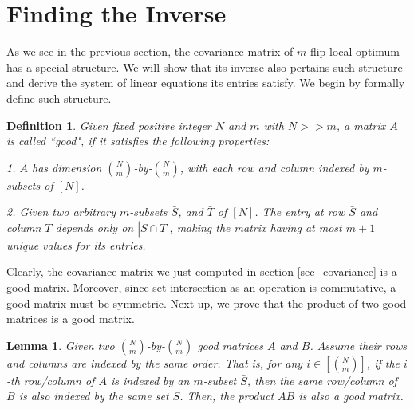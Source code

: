 \documentclass[10pt]{article}
\newtheorem{lemma}{\bf Lemma}
\newtheorem{definition}{\bf Definition}
\newenvironment{Proof of lemma}{\noindent{\bf Proof of Lemma}}{\hfill$\Box$\newline}
\newenvironment{Proof of claim}{\noindent{\bf Proof of claim}}{\hfill$\Box$\newline}
\newenvironment{Proof of theorem}{\noindent{\bf Proof of Theorem}}{\hfill\scriptsize{$\Box$}\newline}
\newenvironment{Proof of theorems}{\noindent{\bf Proof of Theorems}}{\hfill$\Box$\newline}
\newenvironment{Proof of proposition}{\noindent{\bf Proof of Proposition}}{\hfill$\Box$\newline}
\newenvironment{Proof of propositions}{\noindent{\bf Proof of Propositions}}{\hfill$\Box$\newline}
\newenvironment{Proof of exercise}{\noindent{\it Proof of Exercise:}}{\hfill$\Box$}
\numberwithin{equation}{section}
\begin{document}
\section{Finding the Inverse} \label{sec_inverse}
As we see in the previous section, the covariance matrix of $m$-flip local optimum has a special structure. We will show that its inverse also pertains such structure and derive the system of linear equations its entries satisfy. We begin by formally define such structure.
\begin{definition}
    Given fixed positive integer $N$ and $m$ with $N >> m$, a matrix $A$ is called ``good", if it satisfies the following properties:

    1. $A$ has dimension $\binom{N}{m}$-by-$\binom{N}{m}$, with each row and column indexed by $m$-subsets of $[N]$.

    2. Given two arbitrary $m$-subsets $\bar{S}$, and $\bar{T}$ of $[N]$. The entry at row $\bar{S}$ and column $\bar{T}$ depends only on $|\bar{S} \cap \bar{T}|$, making the matrix having at most $m+1$ unique values for its entries.
\end{definition}
Clearly, the covariance matrix we just computed in section \ref{sec_covariance} is a good matrix. Moreover, since set intersection as an operation is commutative, a good matrix must be symmetric. Next up, we prove that the product of two good matrices is a good matrix. 
\begin{lemma} \label{good_matrix_lemma}
    Given two $\binom{N}{m}$-by-$\binom{N}{m}$ good matrices $A$ and $B$. Assume their rows and columns are indexed by the same order. That is, for any $i \in [\binom{N}{m}]$, if the $i$-th row/column of $A$ is indexed by an $m$-subset $\bar{S}$, then the same row/column of $B$ is also indexed by the same set $\bar{S}$. Then, the product $AB$ is also a good matrix. 
\end{lemma}
\end{document}
